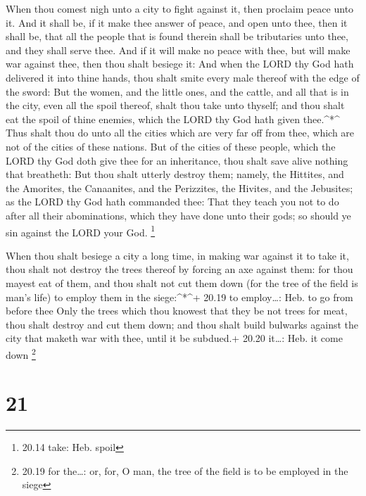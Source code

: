  When thou comest nigh unto a city to fight against it,
then proclaim peace unto it.  And it shall be, if it make
thee answer of peace, and open unto thee, then it shall be, that all the
people that is found therein shall be tributaries unto thee, and they
shall serve thee.  And if it will make no peace with thee,
but will make war against thee, then thou shalt besiege it:
 And when the LORD thy God hath delivered it into thine
hands, thou shalt smite every male thereof with the edge of the sword:
 But the women, and the little ones, and the cattle, and
all that is in the city, even all the spoil thereof, shalt thou take
unto thyself; and thou shalt eat the spoil of thine enemies, which the
LORD thy God hath given thee.\^{}*\^{}  Thus shalt thou do
unto all the cities which are very far off from thee, which are not of
the cities of these nations.  But of the cities of these
people, which the LORD thy God doth give thee for an inheritance, thou
shalt save alive nothing that breatheth:  But thou shalt
utterly destroy them; namely, the Hittites, and the Amorites, the
Canaanites, and the Perizzites, the Hivites, and the Jebusites; as the
LORD thy God hath commanded thee:  That they teach you not
to do after all their abominations, which they have done unto their
gods; so should ye sin against the LORD your God. \footnote{20.14 take:
  Heb. spoil}

 When thou shalt besiege a city a long time, in making war
against it to take it, thou shalt not destroy the trees thereof by
forcing an axe against them: for thou mayest eat of them, and thou shalt
not cut them down (for the tree of the field is man's life) to employ
them in the siege:\^{}*\^{}+ 20.19 to employ\ldots: Heb. to go from
before thee  Only the trees which thou knowest that they be
not trees for meat, thou shalt destroy and cut them down; and thou shalt
build bulwarks against the city that maketh war with thee, until it be
subdued.+ 20.20 it\ldots: Heb. it come down \footnote{20.19 for
  the\ldots: or, for, O man, the tree of the field is to be employed in
  the siege}

\hypertarget{section-20}{%
\section{21}\label{section-20}}

